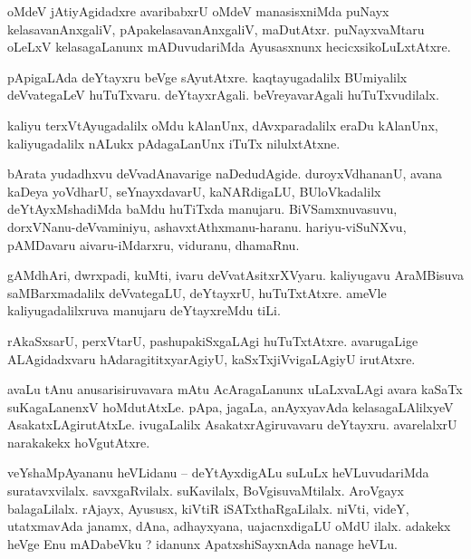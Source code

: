 \documentclass{article}
\begin{document}
\begin{mng}%
oMdeV jAtiyAgidadxre avaribabxrU oMdeV manasisxniMda puNayx kelasavanAnxgaliV, 
pApakelasavanAnxgaliV, maDutAtxr. puNayxvaMtaru oLeLxV kelasagaLanunx mADuvudariMda Ayusasxnunx 
hecicxsikoLuLxtAtxre.
\end{mng}

\begin{mng}%
pApigaLAda deYtayxru beVge sAyutAtxre. kaqtayugadalilx BUmiyalilx deVvategaLeV huTuTxvaru. 
deYtayxrAgali. beVreyavarAgali huTuTxvudilalx.
\end{mng}

\begin{mng}%
kaliyu terxVtAyugadalilx oMdu kAlanUnx, dAvxparadalilx eraDu kAlanUnx, kaliyugadalilx nALukx 
pAdagaLanUnx iTuTx nilulxtAtxne.
\end{mng}

\begin{mng}%
bArata yudadhxvu deVvadAnavarige naDedudAgide. duroyxVdhananU, avana kaDeya yoVdharU, 
seYnayxdavarU, kaNARdigaLU, BUloVkadalilx deYtAyxMshadiMda baMdu huTiTxda manujaru. 
BiVSamxnuvasuvu, dorxVNanu-deVvaminiyu, ashavxtAthxmanu-haranu. hariyu-viSuNXvu, pAMDavaru 
aivaru-iMdarxru, viduranu, dhamaRnu.
\end{mng}

\begin{mng}%
gAMdhAri, dwrxpadi, kuMti, ivaru deVvatAsitxrXVyaru. kaliyugavu AraMBisuva saMBarxmadalilx 
deVvategaLU, deYtayxrU, huTuTxtAtxre. ameVle kaliyugadalilxruva manujaru deYtayxreMdu tiLi.
\end{mng}

\begin{mng}%
rAkaSxsarU, perxVtarU, pashupakiSxgaLAgi huTuTxtAtxre. avarugaLige ALAgidadxvaru 
hAdaragititxyarAgiyU, kaSxTxjiVvigaLAgiyU irutAtxre.
\end{mng}

\begin{mng}%
avaLu tAnu anusarisiruvavara mAtu AcAragaLanunx uLaLxvaLAgi avara kaSaTx suKagaLanenxV 
hoMdutAtxLe. pApa, jagaLa, anAyxyavAda kelasagaLAlilxyeV AsakatxLAgirutAtxLe. ivugaLalilx 
AsakatxrAgiruvavaru deYtayxru. avarelalxrU narakakekx hoVgutAtxre.
\end{mng}

\begin{mng}%
veYshaMpAyananu heVLidanu -- deYtAyxdigALu suLuLx heVLuvudariMda suratavxvilalx. savxgaRvilalx. 
suKavilalx, BoVgisuvaMtilalx. AroVgayx balagaLilalx. rAjayx, Ayususx, kiVtiR iSATxthaRgaLilalx. 
niVti, videY, utatxmavAda janamx, dAna, adhayxyana, uajacnxdigaLU oMdU ilalx. adakekx heVge Enu 
mADabeVku ? idanunx ApatxshiSayxnAda nanage heVLu.
\end{mng}
\end{document}
